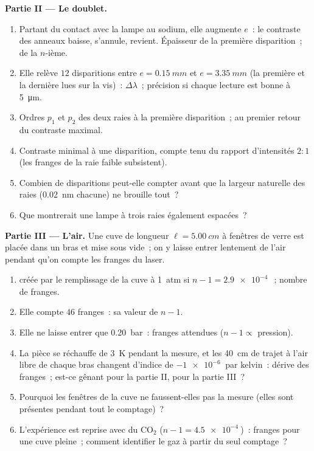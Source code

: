 \begin{problem}
\medskip
\noindent\textbf{Partie II --- Le doublet.}
\begin{enumerate}[resume]
  \item Partant du contact avec la lampe au sodium, elle augmente $e$~:
        le contraste des anneaux baisse, s'annule, revient. Épaisseur de la
        première disparition~; de la $n$-ième.
  \item Elle relève $12$ disparitions entre $e = \qty{0.15}{mm}$ et
        $e = \qty{3.35}{mm}$ (la première et la dernière lues sur la vis)~:
        $\Delta\lambda$~; précision si chaque lecture est bonne à \qty{5}{\micro m}.
  \item Ordres $p_1$ et $p_2$ des deux raies à la première
        disparition~; au premier retour du contraste maximal.
  \item Contraste minimal à une disparition, compte tenu du rapport
        d'intensités $2 : 1$ (les franges de la raie faible subsistent).
  \item Combien de disparitions peut-elle compter avant que la largeur
        naturelle des raies (\qty{0.02}{nm} chacune) ne brouille tout~?
  \item Que montrerait une lampe à trois raies également espacées~?
\end{enumerate}

\medskip
\noindent\textbf{Partie III --- L'air.}
Une cuve de longueur $\ell = \qty{5.00}{cm}$ à fenêtres de verre est placée dans un
bras et mise sous vide~; on y laisse entrer lentement de l'air pendant qu'on compte les
franges du laser.
\begin{enumerate}[resume]
  \item {} créée par le remplissage de la cuve à
        \qty{1}{atm} si $n - 1 = \qty{2.9e-4}{}$~; nombre de franges.
  \item Elle compte $46$ franges~: sa valeur de $n - 1$.
  \item Elle ne laisse entrer que \qty{0.20}{bar}~: franges attendues ($n - 1 \propto$
        pression).
  \item La pièce se réchauffe de \qty{3}{K} pendant la mesure, et les
        \qty{40}{cm} de trajet à l'air libre de chaque bras changent d'indice de
        $-\qty{1e-6}{}$ par kelvin~: dérive des franges~; est-ce gênant pour
        la partie II, pour la partie III~?
  \item Pourquoi les fenêtres de la cuve ne faussent-elles pas la mesure (elles sont
        présentes pendant tout le comptage)~?
  \item L'expérience est reprise avec du CO$_2$ ($n - 1 = \qty{4.5e-4}{}$)~:
        franges pour une cuve pleine~; comment identifier le gaz à partir du
        seul comptage~?
\end{enumerate}


\end{problem}
